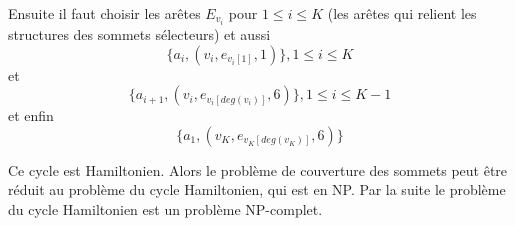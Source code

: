 \documentclass[../main.tex]{subfiles}
\begin{document}
Ensuite il faut choisir les arêtes $E_{v_i}$ pour $1 \leq i \leq K$ (les arêtes qui relient les structures des sommets sélecteurs) et aussi
\[
\{a_i, (v_i, e_{v_i[1]}, 1) \}, 1 \leq i \leq K
\]
et
\[
\{a_{i+1}, (v_i, e_{v_i[deg(v_i)]}, 6 )\}, 1 \leq i \leq K -1
\]
et enfin
\[
\{a_1, (v_K, e_{v_K[deg(v_K)]}, 6 )\}
\]

Ce cycle est Hamiltonien. Alors le problème de couverture des sommets peut être réduit au problème du cycle Hamiltonien, qui est en NP. Par la suite le problème du cycle Hamiltonien est un problème NP-complet.
\end{document}
